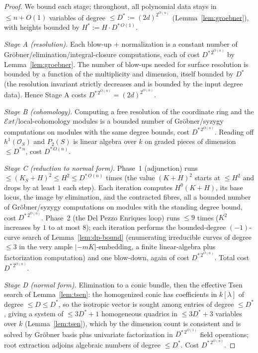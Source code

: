 \documentclass{amsart}
\theoremstyle{plain}
\theoremstyle{definition}
\newcommand{\cO}{\mathcal{O}}
\begin{document}
\begin{proof}
We bound each stage; throughout, all polynomial data stays in $\le n+O(1)$
variables of degree $\le D^*:=(2d)^{2^{O(n)}}$ (Lemma~\ref{lem:groebner}), with
heights bounded by $H^*:=H\cdot D^{*\,O(1)}$.

\emph{Stage A (resolution).}  Each blow-up + normalization is a constant number
of Gr\"obner/elimination/integral-closure computations, each of cost
$D^{*\,2^{O(n)}}$ by Lemma~\ref{lem:groebner}.  The number of blow-ups needed for
surface resolution is bounded by a function of the multiplicity and dimension,
itself bounded by $D^*$ (the resolution invariant strictly decreases and is
bounded by the input degree data).  Hence Stage A costs $D^{*\,2^{O(n)}}=
(2d)^{2^{O(n)}}$.

\emph{Stage B (cohomology).}  Computing a free resolution of the coordinate ring
and the $\mathcal{E}xt$/local-cohomology modules is a bounded number of
Gr\"obner/syzygy computations on modules with the same degree bounds, cost
$D^{*\,2^{O(n)}}$.  Reading off $h^1(\cO_S)$ and $P_2(S)$ is linear algebra over
$k$ on graded pieces of dimension $\le D^{*\,n}$, cost $D^{*\,O(n)}$.

\emph{Stage C (reduction to normal form).}  Phase~1 (adjunction) runs
$\le(K_S+H)^2\le H^2\le D^{*\,O(n)}$ times (the value $(K+H)^2$ starts at $\le
H^2$ and drops by at least $1$ each step).  Each iteration computes $H^0(K+H)$,
its base locus, the image by elimination, and the contracted fibres, all a
bounded number of Gr\"obner/syzygy computations on modules with the standing
degree bound, cost $D^{*\,2^{O(n)}}$.  Phase~2 (the Del Pezzo Enriques loop)
runs $\le9$ times ($K^2$ increases by $1$ to at most $8$); each iteration
performs the bounded-degree $(-1)$-curve search of Lemma~\ref{lem:dp-bound}
(enumerating irreducible curves of degree $\le3$ in the very ample
$|{-mK}|$-embedding, a finite linear-algebra plus factorization computation) and
one blow-down, again of cost $D^{*\,2^{O(n)}}$.  Total cost $D^{*\,2^{O(n)}}$.

\emph{Stage D (normal form).}  Elimination to a conic bundle, then the
effective Tsen search of Lemma~\ref{lem:tsen}: the homogenized conic has
coefficients in $k[\lambda]$ of degree $\le D\le D^*$, so the isotropic vector is
sought among entries of degree $\le D^*$, giving a system of $\le 3D^*+1$
homogeneous quadrics in $\le 3D^*+3$ variables over $k$ (Lemma~\ref{lem:tsen}),
which by the dimension count is consistent and is solved by Gr\"obner basis
plus univariate factorization in $D^{*\,2^{O(1)}}$ field operations; root
extraction adjoins algebraic numbers of degree $\le D^*$.  Cost
$D^{*\,2^{O(n)}}$.


\end{proof}
\end{document}
